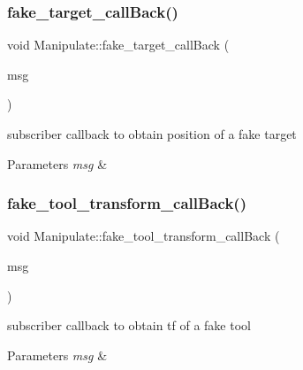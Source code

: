 \subsubsection{\texorpdfstring{fake\+\_\+target\+\_\+call\+Back()}{fake\_target\_callBack()}}
{\footnotesize\ttfamily void Manipulate\+::fake\+\_\+target\+\_\+call\+Back (\begin{DoxyParamCaption}\item[{const geometry\+\_\+msgs\+::\+Pose\+Array\+::\+Ptr \&}]{msg }\end{DoxyParamCaption})\hspace{0.3cm}{\ttfamily [private]}}



subscriber callback to obtain position of a fake target 


\begin{DoxyParams}{Parameters}
{\em msg} & \\
\hline
\end{DoxyParams}
\mbox{\label{structManipulate_a6482d959b897def2c9999acaa53b191a}} 
\subsubsection{\texorpdfstring{fake\+\_\+tool\+\_\+transform\+\_\+call\+Back()}{fake\_tool\_transform\_callBack()}}
{\footnotesize\ttfamily void Manipulate\+::fake\+\_\+tool\+\_\+transform\+\_\+call\+Back (\begin{DoxyParamCaption}\item[{const geometry\+\_\+msgs\+::\+Pose\+Array\+::\+Ptr \&}]{msg }\end{DoxyParamCaption})\hspace{0.3cm}{\ttfamily [private]}}



subscriber callback to obtain tf of a fake tool 


\begin{DoxyParams}{Parameters}
{\em msg} & \\
\hline
\end{DoxyParams}
\mbox{\label{structManipulate_aea788f083af31cad6f9519ffa5903d58}} 
